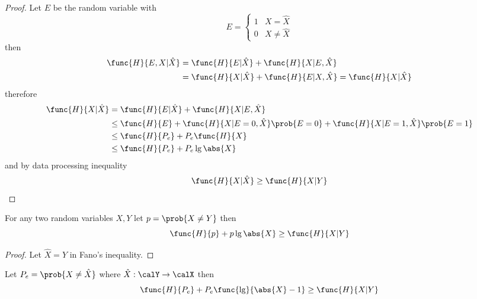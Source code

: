 \begin{proof}
      Let \(E\) be the random variable with 
      \begin{equation*}
            E = \begin{cases}
                  1 & X = \hat{X}\\
                  0 & X \neq \hat{X}
            \end{cases}
      \end{equation*}
      then 
      \begin{align*}
            \func{H}{E,X|\hat{X}} &= \func{H}{E|\hat{X}} + \func{H}{X|E,\hat{X}}\\
            &= \func{H}{X| \hat{X}} + \func{H}{E|X , \hat{X}} = \func{H}{X | \hat{X}}
      \end{align*}
      therefore 
      \begin{align*}
            \func{H}{X | \hat{X}} &= \func{H}{E|\hat{X}} + \func{H}{X|E,\hat{X}}\\
            &\leq \func{H}{E} + \func{H}{X| E = 0, \hat{X}}\prob{E = 0} + \func{H}{X|E = 1, \hat{X}} \prob{E = 1}\\
            &\leq \func{H}{P_e} + P_e \func{H}{X} \\
            &\leq \func{H}{P_e} + P_e \lg \abs{X}
      \end{align*}
      and by data processing inequality 
      \begin{equation*}
            \func{H}{X| \hat{X}} \geq \func{H}{X | Y}
      \end{equation*}
\end{proof}

\begin{corollary}
      For any two random variables \(X,Y\) let \(p = \prob{X \neq Y}\) then 
      \begin{equation*}
            \func{H}{p} + p \lg\abs{X} \geq \func{H}{X|Y}
      \end{equation*}
\end{corollary}
\begin{proof}
      Let \(\hat{X} = Y\) in Fano's inequality.
\end{proof}

\begin{corollary}
      Let \(P_e = \prob{X \neq \hat{X}}\) where \(\hat{X} : \calY \to \calX\) then 
      \begin{equation*}
            \func{H}{P_e} + P_e \func{\lg}{\abs{X} - 1} \geq \func{H}{X|Y}
      \end{equation*}
\end{corollary}


